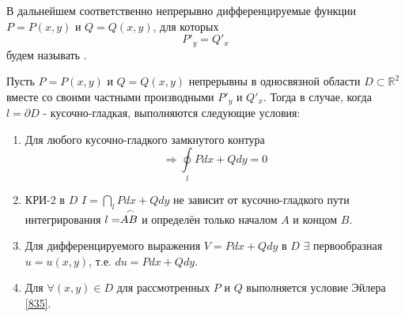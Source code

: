 В дальнейшем соответственно непрерывно дифференцируемые функции $P = P(x,y)$ и $Q = Q(x,y)$, для которых
		\begin{equation}
		\label{835}
 P'_y = Q'_x
 \end{equation} будем называть .
\begin{theorem}
	Пусть $P = P(x,y)$ и $Q = Q(x,y)$ непрерывны в односвязной области $D \subset \mathbb{R}^2$ вместе со своими частными производными $P'_y$ и $Q'_x$. Тогда в случае, когда $l = \partial D$ - кусочно-гладкая, выполняются следующие условия:
	\begin{enumerate}
		\item Для любого кусочно-гладкого замкнутого контура 
		\begin{equation}
		\label{836}
		\Rightarrow \oint\limits_{l} Pdx + Qdy = 0
		\end{equation}
		\item КРИ-2 в $D$ $I = \dint\limits_l Pdx + Qdy$ не зависит от кусочно-гладкого пути интегрирования $l = \arc{AB}$ и определён только началом $A$ и концом $B$.
		\item Для дифференцируемого выражения $V = Pdx + Qdy$ в $D$ $\exists$ первообразная $u = u(x,y)$, т.е. $du = Pdx + Qdy$.
		\item Для $\forall (x,y) \in D$ для рассмотренных $P$ и $Q$ выполняется условие Эйлера \eqref{835}.
	\end{enumerate}
\end{theorem}
